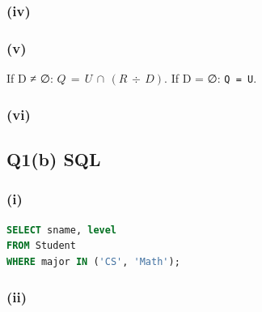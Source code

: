 \subsubsection{(iv)}\label{tutorial2_answers-iv}


\subsubsection{(v)}\label{tutorial2_answers-v}


If D ≠ ∅: \(Q\,=\,U\,\cap \,(R\,\div \,D)\). If D = ∅: \texttt{Q\ =\ U}.

\subsubsection{(vi)}\label{tutorial2_answers-vi}


\Needspace{150pt}
\subsection{Q1(b) SQL}\label{tutorial2_answers-q1b-sql}

\subsubsection{(i)}\label{tutorial2_answers-i-1}

\Needspace{75pt}
\begin{lstlisting}[language=SQL]
SELECT sname, level
FROM Student
WHERE major IN ('CS', 'Math');
\end{lstlisting}

\subsubsection{(ii)}\label{tutorial2_answers-ii-1}

